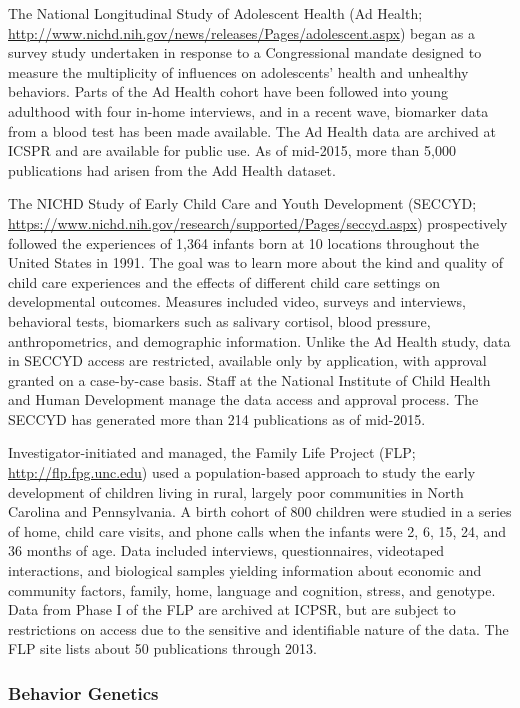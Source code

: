 \documentclass[letterpaper,man,apacite,natbib]{apa6}
\begin{document}
The National Longitudinal Study of Adolescent Health (Ad Health; \url{http://www.nichd.nih.gov/news/releases/Pages/adolescent.aspx}) began as a survey study undertaken in response to a Congressional mandate designed to measure the multiplicity of influences on adolescents' health and unhealthy behaviors.
Parts of the Ad Health cohort have been followed into young adulthood with four in-home interviews, and in a recent wave, biomarker data from a blood test has been made available. 
The Ad Health data are archived at ICSPR and are available for public use.
As of mid-2015, more than 5,000 publications had arisen from the Add Health dataset.

The NICHD Study of Early Child Care and Youth Development (SECCYD; \url{https://www.nichd.nih.gov/research/supported/Pages/seccyd.aspx}) prospectively followed the experiences of 1,364 infants born at 10 locations throughout the United States in 1991.
The goal was to learn more about the kind and quality of child care experiences and the effects of different child care settings on developmental outcomes. 
Measures included video, surveys and interviews, behavioral tests, biomarkers such as salivary cortisol, blood pressure, anthropometrics, and demographic information.
Unlike the Ad Health study, data in SECCYD access are restricted, available only by application, with approval granted on a case-by-case basis.
Staff at the National Institute of Child Health and Human Development manage the data access and approval process.
The SECCYD has generated more than 214 publications as of mid-2015.

Investigator-initiated and managed, the Family Life Project (FLP; \url{http://flp.fpg.unc.edu}) used a population-based approach to study the early development of children living in rural, largely poor communities in North Carolina and Pennsylvania. 
A birth cohort of 800 children were studied in a series of home, child care visits, and phone calls when the infants were 2, 6, 15, 24, and 36 months of age. 
Data included interviews, questionnaires, videotaped interactions, and biological samples yielding information about economic and community factors, family, home, language and cognition, stress, and genotype.
Data from Phase I of the FLP are archived at ICPSR, but are subject to restrictions on access due to the sensitive and identifiable nature of the data.
The FLP site lists about 50 publications through 2013.

\subsubsection{Behavior Genetics}
\end{document}

